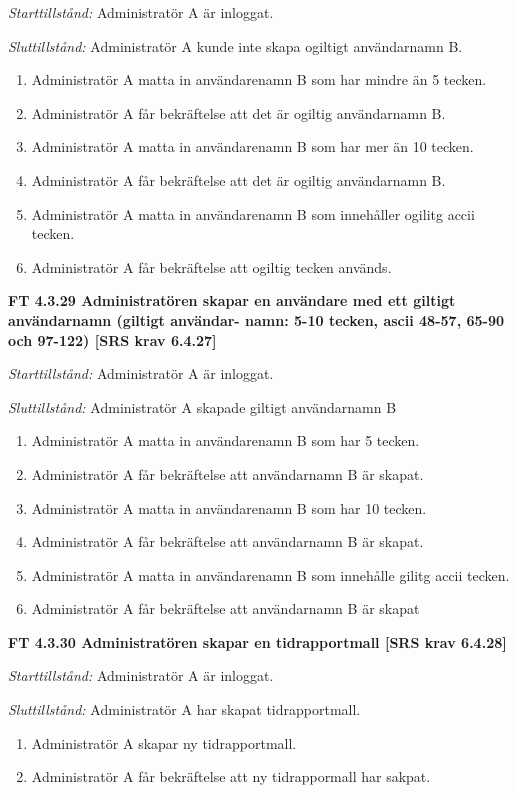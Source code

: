 \documentclass[a4paper]{article}
\begin{document}
\emph{Starttillstånd:} Administratör A är inloggat.

\emph{Sluttillstånd:} Administratör A kunde inte skapa ogiltigt användarnamn B.

\begin{enumerate}
\item Administratör A matta in användarenamn B som har mindre än 5 tecken.
\item Administratör A får bekräftelse att det är ogiltig användarnamn B.
\item Administratör A matta in användarenamn B som har mer än 10 tecken.
\item Administratör A får bekräftelse att det är ogiltig användarnamn B.
\item Administratör A matta in användarenamn B som innehåller ogilitg accii tecken.
\item Administratör A får bekräftelse att ogiltig tecken används.
\end{enumerate}

\textbf{FT 4.3.29 Administratören skapar en användare med ett giltigt användarnamn (giltigt användar- namn: 5-10 tecken, ascii 48-57, 65-90 och 97-122) [SRS krav 6.4.27]}

\emph{Starttillstånd:} Administratör A är inloggat.

\emph{Sluttillstånd:} Administratör A skapade  giltigt användarnamn B

\begin{enumerate}
\item Administratör A matta in användarenamn B som har 5 tecken.
\item Administratör A får bekräftelse att användarnamn B är skapat.
\item Administratör A matta in användarenamn B som har 10 tecken.
\item Administratör A får bekräftelse att användarnamn B är skapat.
\item Administratör A matta in användarenamn B som innehålle gilitg accii tecken.
\item Administratör A får bekräftelse att användarnamn B är skapat
\end{enumerate}

\textbf{FT 4.3.30 Administratören skapar en tidrapportmall [SRS krav 6.4.28]}

\emph{Starttillstånd:} Administratör A är inloggat.

\emph{Sluttillstånd:} Administratör A har skapat tidrapportmall.

\begin{enumerate}
\item Administratör A skapar ny tidrapportmall.
\item Administratör A får bekräftelse att ny tidrappormall har sakpat.
\end{enumerate}
\end{document}
